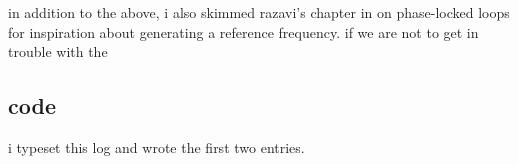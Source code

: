 in addition to the above, i also skimmed razavi's chapter in
\autocite{rf-microelectronics} on phase-locked loops for inspiration about
generating a reference frequency. if we are not to get in trouble with the \fcc

\subsection*{code}
i typeset this log and wrote the first two entries.
